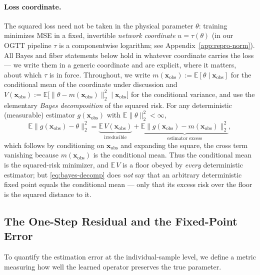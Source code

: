 \paragraph{Loss coordinate.} The squared loss need not be taken in the physical parameter $\theta$: training minimizes MSE in a fixed, invertible \emph{network coordinate} $u=\tau(\theta)$ (in our OGTT pipeline $\tau$ is a componentwise logarithm; see Appendix~\ref{app:repro-norm}). All Bayes and fiber statements below hold in whatever coordinate carries the loss --- we write them in a generic coordinate and are explicit, where it matters, about which $\tau$ is in force. Throughout, we write $m(\mathbf{x}_\mathrm{obs}):=\mathbb{E}[\theta\mid\mathbf{x}_\mathrm{obs}]$ for the conditional mean of the coordinate under discussion and $V(\mathbf{x}_\mathrm{obs}):=\mathbb{E}\big[\|\theta-m(\mathbf{x}_\mathrm{obs})\|_2^2\mid\mathbf{x}_\mathrm{obs}\big]$ for the conditional variance, and use the elementary \emph{Bayes decomposition} of the squared risk. For any deterministic (measurable) estimator $g(\mathbf{x}_\mathrm{obs})$ with $\mathbb{E}\|\theta\|_2^2<\infty$,
\begin{equation}
\label{eq:bayes-decomp}
\mathbb{E}\big\|g(\mathbf{x}_\mathrm{obs})-\theta\big\|_2^2
=
\underbrace{\mathbb{E}\,V(\mathbf{x}_\mathrm{obs})}_{\text{irreducible}}
+
\underbrace{\mathbb{E}\big\|g(\mathbf{x}_\mathrm{obs})-m(\mathbf{x}_\mathrm{obs})\big\|_2^2}_{\text{estimator excess}},
\end{equation}
which follows by conditioning on $\mathbf{x}_\mathrm{obs}$ and expanding the square, the cross term vanishing because $m(\mathbf{x}_\mathrm{obs})$ is the conditional mean. Thus the conditional mean is the squared-risk minimizer, and $\mathbb{E}\,V$ is a floor obeyed by \emph{every} deterministic estimator; but \eqref{eq:bayes-decomp} does \emph{not} say that an arbitrary deterministic fixed point equals the conditional mean --- only that its excess risk over the floor is the squared distance to it.

\subsection{The One-Step Residual and the Fixed-Point Error}

To quantify the estimation error at the individual-sample level, we define a metric measuring how well the learned operator preserves the true parameter.

